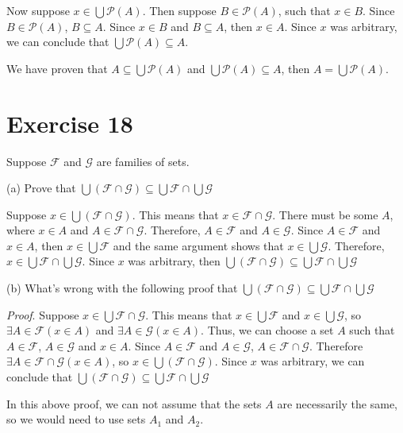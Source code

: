 \documentclass[11pt]{article}
\newcommand{\powerset}[1]{\mathscr{P}(#1)}
\newcommand{\family}[1]{\mathcal{#1}}
\begin{document}
Now suppose $x \in \bigcup \powerset{A}$. Then suppose $B \in \powerset{A}$,
such that $x \in B$. Since $B \in \powerset{A}$, $B \subseteq A$. 
Since $x \in B$ and $B \subseteq A$, then $x \in A$. Since $x$ was arbitrary,
we can conclude that $\bigcup \powerset{A} \subseteq A$. 

We have proven that $A \subseteq \bigcup \powerset{A}$ and 
$\bigcup \powerset{A} \subseteq A$, then $A = \bigcup \powerset{A}$.

\section*{Exercise 18}

Suppose $\family{F}$ and $\family{G}$ are families of sets.

\noindent (a) Prove that 
$\bigcup (\family{F} \cap \family{G}) \subseteq \bigcup \family{F} \cap \bigcup \family{G}$

Suppose $x \in \bigcup (\family{F} \cap \family{G})$. This means that 
$x \in \family{F} \cap \family{G}$. There must be some $A$, where $x \in A$ 
and $A \in \family{F} \cap \family{G}$. Therefore, $A \in \family{F}$ and 
$A \in \family{G}$. Since $A \in \family{F}$ and $x \in A$, then 
$x \in \bigcup \family{F}$ and the same argument shows that 
$x \in \bigcup \family{G}$. Therefore, 
$x \in \bigcup \family{F} \cap \bigcup \family{G}$. Since $x$ was arbitrary, then 
$\bigcup (\family{F} \cap \family{G}) \subseteq \bigcup \family{F} \cap \bigcup \family{G}$

\noindent (b) What's wrong with the following proof that 
$\bigcup (\family{F} \cap \family{G}) \subseteq \bigcup \family{F} \cap \bigcup \family{G}$

\textit{Proof}. Suppose $x \in \bigcup \family{F} \cap \family{G}$. This means 
that $x \in \bigcup \family{F}$ and $x \in \bigcup \family{G}$, so 
$\exists A \in \family{F} (x \in A)$ and $\exists A \in \family{G} (x \in A)$.
Thus, we can choose a set $A$ such that $A \in \family{F}$, $A \in \family{G}$
and $x \in A$. Since $A \in \family{F}$ and $A \in \family{G}$, 
$A \in \family{F} \cap \family{G}$. Therefore 
$\exists A \in \family{F} \cap \family{G} (x \in A)$, so 
$x \in \bigcup (\family{F} \cap \family{G})$. Since $x$ was arbitrary, we can 
conclude that 
$\bigcup (\family{F} \cap \family{G}) \subseteq \bigcup \family{F} \cap \bigcup \family{G}$

In this above proof, we can not assume that the sets $A$ are necessarily the 
same, so we would need to use sets $A_1$ and $A_2$.
\end{document}
